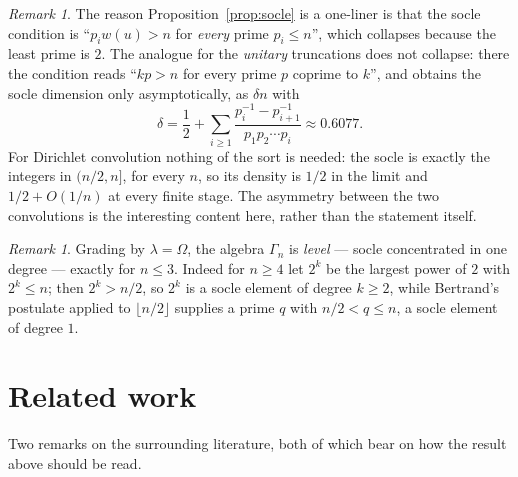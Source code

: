 \documentclass[a4paper,11pt,oneside,reqno]{amsart}
\theoremstyle{definition}
\theoremstyle{remark}
\newtheorem{remark}[definition]{Remark}
\theoremstyle{plain}
\newcommand{\Om}{\Omega}
\newcommand{\Gam}{\Gamma}
\begin{document}
\begin{remark}\label{rem:unitary}
  The reason Proposition~\ref{prop:socle} is a one-liner is that the socle
  condition is ``\(p_iw(u) > n\) for \emph{every} prime \(p_i \le n\)'', which
  collapses because the least prime is \(2\). The analogue for the
  \emph{unitary} truncations does not collapse: there the condition reads
  ``\(kp > n\) for every prime \(p\) coprime to \(k\)'', and
  \cite[\S7]{SnellmanUnitaryN} obtains the socle dimension only
  asymptotically, as \(\delta n\) with
  \[
    \delta = \frac{1}{2}+\sum_{i \ge 1}
      \frac{p_i^{-1}-p_{i+1}^{-1}}{p_1p_2\cdots p_i} \approx 0.6077 .
  \]
  For Dirichlet convolution nothing of the sort is needed: the socle is
  exactly the integers in \((n/2,n]\), for every \(n\), so its density is
  \(1/2\) in the limit and \(1/2+O(1/n)\) at every finite stage. The asymmetry between the two convolutions is the interesting
  content here, rather than the statement itself.
\end{remark}

\begin{remark}
  Grading by \(\lambda = \Om\), the algebra \(\Gam_n\) is \emph{level} --- socle
  concentrated in one degree --- exactly for \(n \le 3\). Indeed for \(n \ge 4\)
  let \(2^{k}\) be the largest power of \(2\) with \(2^{k} \le n\); then
  \(2^{k} > n/2\), so \(2^{k}\) is a socle element of degree \(k \ge 2\), while
  Bertrand's postulate applied to \(\lfloor n/2\rfloor\) supplies a prime
  \(q\) with \(n/2 < q \le n\), a socle element of degree \(1\).
\end{remark}

\section{Related work}\label{sec:related}

Two remarks on the surrounding literature, both of which bear on how the result
above should be read.
\end{document}

